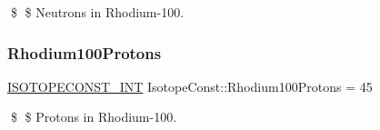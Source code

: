 \$ \$ Neutrons in Rhodium-\/100. \mbox{\label{group___isotope_const-_rhodium-_rh100_ga111dadcfed7ce05ee302af04a01bf5b7}} 
\subsubsection{\texorpdfstring{Rhodium100\+Protons}{Rhodium100Protons}}
{\footnotesize\ttfamily \mbox{\hyperlink{group___isotope_const-_macros_ga5f18360b3e99483a35c32d789e62621c}{I\+S\+O\+T\+O\+P\+E\+C\+O\+N\+S\+T\+\_\+\+I\+NT}} Isotope\+Const\+::\+Rhodium100\+Protons = 45}

\$ \$ Protons in Rhodium-\/100. 